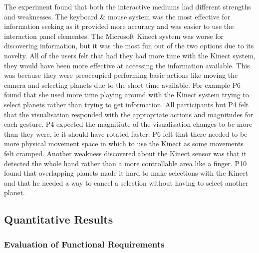 \begin{enumerate}
The experiment found that both the interactive mediums had different
strengths and weaknesses. The keyboard \& mouse system was the most effective
for information seeking as it provided more accuracy and was easier to use the
interaction panel elementes. The Microsoft Kinect system was worse for discovering
information, but it was the most fun out of the two options due to its novelty.
All of the users felt that had they had more time with the Kinect system, they
would have been more effective at accessing the information available. This was
because they were preoccupied performing basic actions like moving the camera
and selecting planets due to the short time available. For example P6 found that
she used more time playing around with the Kinect system trying to select
planets rather than trying to get information. All participants but P4 felt that
the visualisation responded with the appropriate actions and magnitudes for each
gesture. P4 expected the magnitiute of the visualisation changes to be more
than they were, ie it should have rotated faster. P6 felt that there needed to
be more physical movement space in which to use the Kinect as some movements felt
cramped. Another weakness discovered about the Kinect sensor was that it
detected the whole hand rather than a more controllable area like a finger.
P10 found that overlapping planets made it hard to make selections with the
Kinect and that he needed a way to cancel a selection without having to select
another planet.

\end{enumerate}

\subsection{Quantitative Results}
\subsubsection{Evaluation of Functional Requirements}


